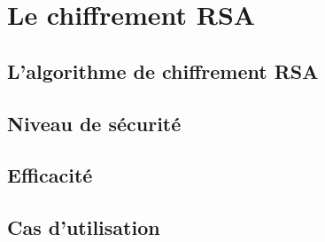 \chapter{Le chiffrement RSA}
	\section{L'algorithme de chiffrement RSA}
	\section{Niveau de sécurité}
	\section{Efficacité}
	\section{Cas d'utilisation}